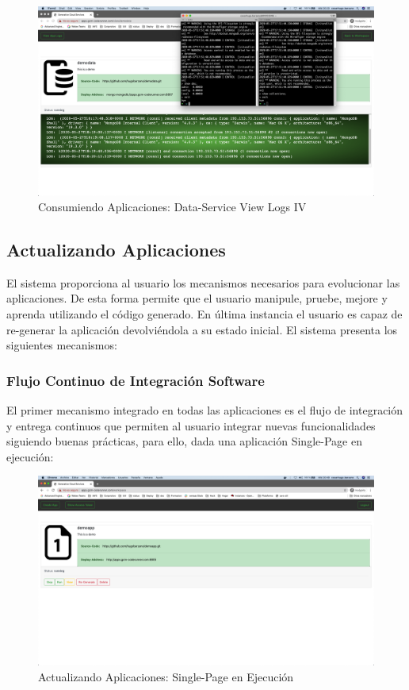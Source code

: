 \documentclass[a4paper,11pt]{book}
\begin{document}
\begin{figure}[H]
\centering
\includegraphics[scale=0.2]{imagenes/casouso/1_17.png}
\caption{ Consumiendo Aplicaciones: Data-Service View Logs IV   }
\end{figure}



\subsection{Actualizando Aplicaciones}

El sistema proporciona al usuario los mecanismos necesarios para evolucionar las aplicaciones. De esta forma permite que el usuario manipule, pruebe, mejore y aprenda utilizando el código generado. En última instancia el usuario es capaz de re-generar la aplicación devolviéndola a su estado inicial. El sistema presenta los siguientes mecanismos:

\subsubsection{Flujo Continuo de Integración Software}

El primer mecanismo integrado en todas las aplicaciones es el flujo de integración y entrega continuos que permiten al usuario integrar nuevas funcionalidades siguiendo buenas prácticas, para ello, dada una aplicación Single-Page en ejecución:

\begin{figure}[H]
\centering
\includegraphics[scale=0.2]{imagenes/casouso/2_1.png}
\caption{ Actualizando Aplicaciones: Single-Page en Ejecución  }
\end{figure}
\end{document}
